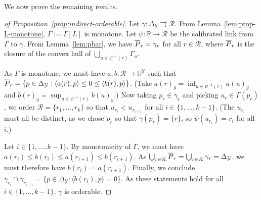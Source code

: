 \documentclass[12pt]{article}
\newcommand{\reals}{\mathbb{R}}
\newcommand{\prop}[1]{\Gamma[#1]}
\newcommand{\simplex}{\Delta_\Y}
\newcommand{\R}{\mathcal{R}}
\newcommand{\Y}{\mathcal{Y}}
\newcommand{\inprod}[2]{\langle #1, #2 \rangle}%
\newcommand{\inter}[1]{\mathring{#1}}%
\newcommand{\toto}{\rightrightarrows}
\begin{document}
We now prove the remaining results.
\begin{proof}[of Proposition~\ref{prop:indirect-orderable}]
  Let $\gamma:\simplex\toto\R$.
  From Lemma~\ref{lem:prop-L-monotone}, $\Gamma := \prop{L}$ is monotone.
  Let $\psi:\reals\to\R$ be the calibrated link from $\Gamma$ to $\gamma$.
  From Lemma~\ref{lem:pbar}, we have $\overline P_r = \gamma_r$ for all $r\in\R$, where $\overline P_r$ is the closure of the convex hull of $\bigcup_{u\in\psi^{-1}(r)} \Gamma_u$.

  As $\Gamma$ is monotone, we must have $a,b : \R\to\reals^\Y$ such that $\Pbar_r = \{p\in\simplex : \inprod{a(r)}{p} \leq 0 \leq \inprod{b(r)}{p} \}$.
  (Take $a(r)_y = \inf_{u\in\psi^{-1}(r)} a(u)_y$ and $b(r)_y = \sup_{u\in\psi^{-1}(r)} b(u)_y$.)
  Now taking $p_r\in\inter\gamma_r$ and picking $u_r \in \Gamma(p_r)$, we order $\R = \{r_1,\ldots,r_k\}$ so that $u_{r_i} < u_{r_{i+1}}$ for all $i\in\{1,\ldots,k-1\}$.
  (The $u_{r_i}$ must all be distinct, as we chose $p_r$ so that $\gamma(p_r) = \{r\}$, so $\psi(u_{r_i}) = r_i$ for all $i$.)

  Let $i\in\{1,\ldots,k-1\}$.
  By monotonicity of $\Gamma$, we must have $a(r_i) \leq b(r_i) \leq a(r_{i+1}) \leq b(r_{i+1})$.
  As $\bigcup_{r\in\R} \Pbar_r = \bigcup_{r\in\R} \gamma_r = \simplex$, we must therefore have $b(r_i) = a(r_{i+1})$.
  Finally, we conclude $\gamma_{r_i} \cap \gamma_{r_{i+1}} = \{p\in\simplex : \inprod{b(r_i)}{p} = 0\}$.
  As these statements hold for all $i\in\{1,\ldots,k-1\}$, $\gamma$ is orderable.
\end{proof}
\end{document}
